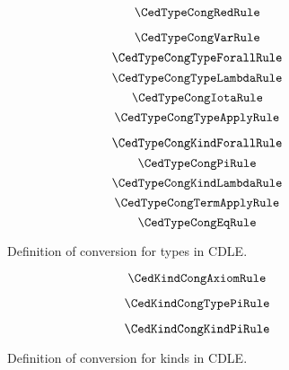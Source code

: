 \begin{figure}
    \centering
    $$\CedTypeCongRedRule$$
    \begin{minipage}{0.5\textwidth}
        $$\CedTypeCongVarRule$$
        $$\CedTypeCongTypeForallRule$$
        $$\CedTypeCongTypeLambdaRule$$
        $$\CedTypeCongIotaRule$$
        $$\CedTypeCongTypeApplyRule$$
    \end{minipage}%
    \begin{minipage}{0.5\textwidth}
        $$\CedTypeCongKindForallRule$$
        $$\CedTypeCongPiRule$$
        $$\CedTypeCongKindLambdaRule$$
        $$\CedTypeCongTermApplyRule$$
        $$\CedTypeCongEqRule$$
    \end{minipage}%
    \caption{
        Definition of conversion for types in CDLE.
    }
    \label{fig:4:type_cong}
\end{figure}

\begin{figure}
    \centering
    $$\CedKindCongAxiomRule$$
    \begin{minipage}{0.5\textwidth}
        $$\CedKindCongTypePiRule$$
    \end{minipage}%
    \begin{minipage}{0.5\textwidth}
        $$\CedKindCongKindPiRule$$
    \end{minipage}%
    \caption{
        Definition of conversion for kinds in CDLE.
    }
    \label{fig:4:kind_cong}
\end{figure}
